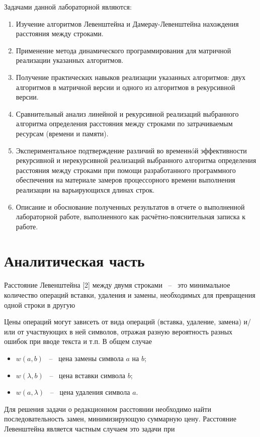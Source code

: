 \documentclass[14pt,russian]{scrartcl}
\begin{document}
Задачами данной лабораторной являются:
\begin{enumerate}
	\item Изучение алгоритмов Левенштейна и Дамерау-Левенштейна нахождения расстояния между строками.
	\item Применение метода динамического программирования для матричной реализации указанных алгоритмов.
	\item Получение практических навыков реализации указанных алгоритмов: двух алгоритмов в матричной версии и одного из алгоритмов в рекурсивной версии.
	\item Сравнительный анализ линейной и рекурсивной реализаций выбранного алгоритма определения расстояния между строками по затрачиваемым ресурсам (времени и памяти).
	\item Экспериментальное подтверждение различий во временнóй эффективности рекурсивной и
	      нерекурсивной реализаций выбранного алгоритма определения расстояния между строками при
	      помощи разработанного программного обеспечения на материале замеров процессорного времени
	      выполнения реализации на варьирующихся длинах строк.
	\item Описание и обоснование полученных результатов в отчете о выполненной лабораторной
	      работе, выполненного как расчётно-пояснительная записка к работе. 
\end{enumerate}

\section{Аналитическая часть}
Расстояние Левенштейна [2] между двумя строками ~--~ это минимальное количество операций вставки, удаления и замены, необходимых для превращения одной строки в другую

Цены операций могут зависеть от вида операций (вставка, удаление, замена) и/или от участвующих в ней символов, отражая разную вероятность разных ошибок при вводе текста и т.п. В общем случае

\begin{itemize}
	\item $w(a, b)$ ~--~ цена замены символа $a$ на $b$;
	\item $w(\lambda, b)$ ~--~ цена вставки символа $b$;
	\item $w(a, \lambda)$ ~--~ цена удаления символа $a$.
\end{itemize}

Для решения задачи о редакционном расстоянии необходимо найти последовательность замен, минимизирующую суммарную цену. Расстояние Левенштейна является частным случаем это задачи при
\end{document}
